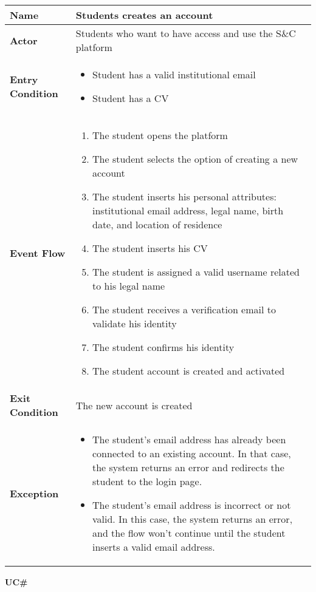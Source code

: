 \begin{longtable}{|p{}|p{}|}
\hline
\textbf{Name} & Students creates an account \\
\hline
\textbf{Actor} & Students who want to have access and use the S\&C platform \\
\hline
\textbf{Entry Condition} & 
\begin{itemize}
    \item Student has a valid institutional email
    \item Student has a CV
\end{itemize} \\
\hline
\textbf{Event Flow} & 
\begin{enumerate}
    \item The student opens the platform
    \item The student selects the option of creating a new account
    \item The student inserts his personal attributes: institutional email address, legal name, birth date, and location of residence
    \item The student inserts his CV
    \item The student is assigned a valid username related to his legal name
    \item The student receives a verification email to validate his identity
    \item The student confirms his identity
    \item The student account is created and activated
\end{enumerate} \\
\hline
\textbf{Exit Condition} & The new account is created \\
\hline
\textbf{Exception} & 
\begin{itemize}
    \item The student's email address has already been connected to an existing account. In that case, the system returns an error and redirects the student to the login page.
    \item The student's email address is incorrect or not valid. In this case, the system returns an error, and the flow won't continue until the student inserts a valid email address.
\end{itemize} \\
\hline
\end{longtable}


\textbf{UC\#}


